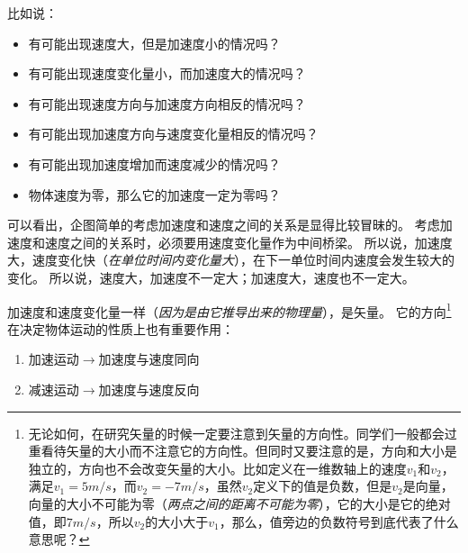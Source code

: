 					比如说：
					\begin{itemize}
						\item 有可能出现速度大，但是加速度小的情况吗？
						\item 有可能出现速度变化量小，而加速度大的情况吗？
						\item 有可能出现速度方向与加速度方向相反的情况吗？
						\item 有可能出现加速度方向与速度变化量相反的情况吗？
						\item 有可能出现加速度增加而速度减少的情况吗？
						\item 物体速度为零，那么它的加速度一定为零吗？
					\end{itemize}

					可以看出，企图简单的考虑加速度和速度之间的关系是显得比较冒昧的。%
					考虑加速度和速度之间的关系时，必须要用速度变化量作为中间桥梁。%
					所以说，加速度大，速度变化快（\emph{在单位时间内变化量大}），在下一单位时间内速度会发生较大的变化。%
					所以说，速度大，加速度不一定大；加速度大，速度也不一定大。

					加速度和速度变化量一样（\emph{因为是由它推导出来的物理量}），是矢量。%
					它的方向\footnote{无论如何，在研究矢量的时候一定要注意到矢量的方向性。同学们一般都会过重看待矢量的大小而不注意它的方向性。但同时又要注意的是，方向和大小是独立的，方向也不会改变矢量的大小。比如定义在一维数轴上的速度$v_1$和$v_2$，满足$v_1=5m/s$，而$v_2=-7m/s$，虽然$v_2$定义下的值是负数，但是$v_2$是向量，向量的大小不可能为零（\emph{两点之间的距离不可能为零}），它的大小是它的绝对值，即$7m/s$，所以$v_2$的大小大于$v_1$，那么，值旁边的负数符号到底代表了什么意思呢？}在决定物体运动的性质上也有重要作用：
					\begin{enumerate}
						\item 加速运动$\to$加速度与速度同向
						\item 减速运动$\to$加速度与速度反向
					\end{enumerate}

